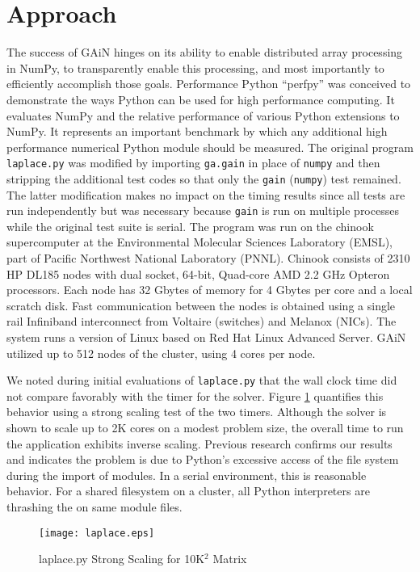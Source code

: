 \documentclass{sig-alt-release2}
\begin{document}
\section{Approach}
The success of GAiN hinges on its ability to enable distributed array
processing in NumPy, to transparently enable this processing, and most
importantly to efficiently accomplish those goals. Performance Python
\cite{Ram08} ``perfpy'' was conceived to demonstrate the ways Python can be
used for high performance computing. It evaluates NumPy and the relative
performance of various Python extensions to NumPy. It represents an important
benchmark by which any additional high performance numerical Python module
should be measured. The original program \texttt{laplace.py} was modified by
importing \texttt{ga.gain} in place of \texttt{numpy} and then stripping the
additional test codes so that only the \texttt{gain} (\texttt{numpy}) test
remained. The latter modification makes no impact on the timing results since
all tests are run independently but was necessary because \texttt{gain} is run
on multiple processes while the original test suite is serial.  The program was
run on the chinook supercomputer at the Environmental Molecular Sciences
Laboratory (EMSL), part of Pacific Northwest National Laboratory (PNNL).
Chinook consists of 2310 HP DL185 nodes with dual socket, 64-bit, Quad-core AMD
2.2 GHz Opteron processors. Each node has 32 Gbytes of memory for 4 Gbytes per
core and a local scratch disk.  Fast communication between the nodes is
obtained using a single rail Infiniband interconnect from Voltaire (switches)
and Melanox (NICs). The system runs a version of Linux based on Red Hat Linux
Advanced Server.  GAiN utilized up to 512 nodes of the cluster, using 4 cores
per node.

We noted during initial evaluations of \texttt{laplace.py} that the wall clock
time did not compare favorably with the timer for the solver. Figure
\ref{fig:laplace} quantifies this behavior using a strong scaling test of the
two timers. Although the solver is shown to scale up to 2K cores on a modest
problem size, the overall time to run the application exhibits inverse scaling.
Previous research \cite{Scu11,Man11} confirms our results and indicates the
problem is due to Python's excessive access of the file system during the
import of modules. In a serial environment, this is reasonable behavior. For a
shared filesystem on a cluster, all Python interpreters are thrashing the on
same module files.

\begin{figure}
\centering
\texttt{[image: laplace.eps]}
\caption{laplace.py Strong Scaling for 10K$^2$ Matrix}
\label{fig:laplace}
\end{figure}
\end{document}

